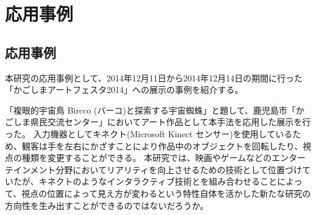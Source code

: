 \chapter{応用事例}

\section{応用事例}
\label{SKagoshima}

本研究の応用事例として、2014年12月11日から2014年12月14日の期間に行った「かごしまアートフェスタ2014」への展示の事例を紹介する。

「複眼的宇宙鳥 Bircco (バーコ)と探索する宇宙蜘蛛」と題して、鹿児島市「かごしま県民交流センター」においてアート作品として本手法を応用した展示を行った。
入力機器としてキネクト(Microsoft Kinect センサー)を使用しているため、観客は手を左右にかざすことにより作品中のオブジェクトを回転したり、視点の種類を変更することができる。
本研究では、映画やゲームなどのエンターテインメント分野においてリアリティを向上させるための技術として位置づけていたが、キネクトのようなインタラクティブ技術とを組み合わせることによって、視点の位置によって見え方が変わるという特性自体を活かした新たな研究の方向性を生み出すことができるのではないだろうか。





